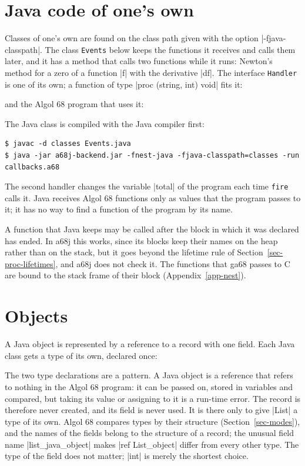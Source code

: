
\section*{Java code of one's own}

Classes of one's own are found on the class path given with the option
\code|-fjava-classpath|. The class \texttt{Events} below keeps the
functions it receives and calls them later, and it has a method that
calls two functions while it runs: Newton's method for a zero of a
function \code|f| with the derivative \code|df|. The interface
\texttt{Handler} is one of its own; a function of type
\code|proc (string, int) void| fits it:


\noindent and the Algol 68 program that uses it:


\noindent The Java class is compiled with the Java compiler first:
\begin{lstlisting}[style=shell]
$ javac -d classes Events.java
$ java -jar a68j-backend.jar -fnest-java -fjava-classpath=classes -run callbacks.a68
\end{lstlisting}
The second handler changes the variable \code|total| of the program each
time \texttt{fire} calls it. Java receives Algol 68 functions only as
values that the program passes to it; it has no way to find a function of
the program by its name.

A function that Java keeps may be called after the block in which it was
declared has ended. In a68j this works, since its blocks keep their names
on the heap rather than on the stack, but it goes beyond the lifetime
rule of Section~\ref{sec-proc-lifetimes}, and a68j does not check it. The
functions that ga68 passes to C are bound to the stack frame of their
block (Appendix~\ref{app-nest}).

\section*{Objects}

A Java object is represented by a reference to a record with one field.
Each Java class gets a type of its own, declared once:


\noindent The two type declarations are a pattern. A Java object is a
reference that refers to nothing in the Algol 68 program: it can be
passed on, stored in variables and compared, but taking its value or
assigning to it is a run-time error. The record is therefore never
created, and its field is never used. It is there only to give
\code|List| a type of its own. Algol 68 compares types by their structure
(Section~\ref{sec-modes}), and the names of the fields belong to the
structure of a record; the unusual field name \code|list_java_object|
makes \code|ref List_object| differ from every other type. The type of
the field does not matter; \code|int| is merely the shortest choice.

